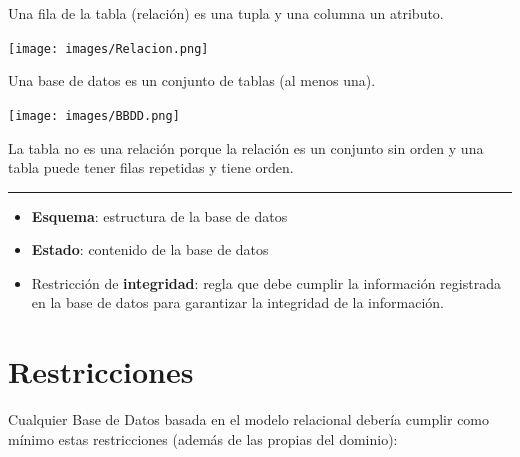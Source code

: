 \documentclass[
]{book}
\begin{document}
Una fila de la tabla (relación) es una tupla y una columna un atributo.

\texttt{[image: images/Relacion.png]}

Una base de datos es un conjunto de tablas (al menos una).

\texttt{[image: images/BBDD.png]}

La tabla no es una relación porque la relación es un conjunto sin orden y una tabla puede tener filas repetidas y tiene orden.

\begin{center}\rule{0.5\linewidth}{0.5pt}\end{center}

\begin{itemize}
\item
  \textbf{Esquema}: estructura de la base de datos
\item
  \textbf{Estado}: contenido de la base de datos
\item
  Restricción de \textbf{integridad}: regla que debe cumplir la información registrada en la base de datos para garantizar la integridad de la información.
\end{itemize}

\section{Restricciones}\label{restricciones}

Cualquier Base de Datos basada en el modelo relacional debería cumplir como mínimo estas restricciones (además de las propias del dominio):
\end{document}
